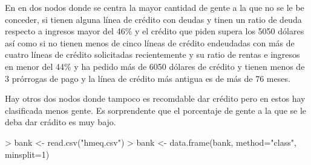 \documentclass [a4paper] {article}
\begin{document}
En en dos nodos donde se centra la mayor cantidad de gente a la que no se le be conceder,
si tienen alguna línea de crédito con deudas y
tinen un ratio de deuda respecto a ingresos mayor del 46\% y
el crédito que piden supera los 5050 dólares así como
si no tienen menos de cinco líneas de crédito endeudadas
con más de cuatro líneas de crédito solicitadas recientemente y
su ratio de rentas e ingresos en menor del 44\% y
ha pedido más de 6050 dólares de crédito y
tienen menos de 3 prórrogas de pago y
la línea de crédito más antigua es de más de 76 meses.

Hay otros dos nodos donde tampoco es recomdable dar crédito pero en estos hay clasificada menos gente.
Es sorprendente que el porcentaje de gente a la que se le deba dar crádito es muy bajo.
\begin{Schunk}
\begin{Sinput}
> bank <- read.csv("hmeq.csv")
> bank <- data.frame(bank, method="class", minsplit=1)
\end{Sinput}
\end{Schunk}
\end{document}

